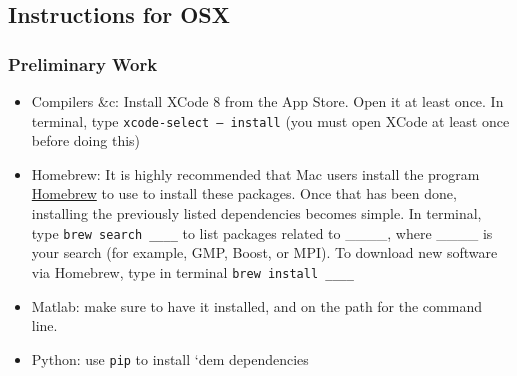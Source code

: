 
\subsection{Instructions for OSX}


\subsubsection{Preliminary Work}
\begin{itemize}
  \item Compilers \&c: Install XCode 8 from the App Store.  Open it at least once.  In terminal, type {\tt xcode-select -- install} (you must open XCode at least once before doing this)
   
  \item Homebrew: It is highly recommended that Mac users install the program \href{http://brew.sh}{Homebrew} to use to install these packages. Once that has been done, installing the previously listed dependencies becomes simple. In terminal,  type \texttt{brew search \_\_\_\_} to list packages related to \_\_\_\_, where \_\_\_\_ is your search (for example, GMP, Boost, or MPI). To download new software via Homebrew, type in terminal \texttt{brew install \_\_\_\_} 
   \item Matlab: make sure to have it installed, and on the path for the command line.
   \item Python: use {\tt pip} to install `dem dependencies
\end{itemize}


